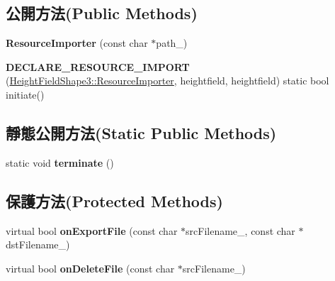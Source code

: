 \subsection*{公開方法(Public Methods)}
\begin{DoxyCompactItemize}
\item 
{\bfseries Resource\+Importer} (const char $\ast$path\+\_\+)\hypertarget{class_magnum_1_1_height_field_shape3_1_1_resource_importer_ad81a6123eea685a7084aedad8a18cd4a}{}\label{class_magnum_1_1_height_field_shape3_1_1_resource_importer_ad81a6123eea685a7084aedad8a18cd4a}

\item 
{\bfseries D\+E\+C\+L\+A\+R\+E\+\_\+\+R\+E\+S\+O\+U\+R\+C\+E\+\_\+\+I\+M\+P\+O\+RT} (\hyperlink{class_magnum_1_1_height_field_shape3_1_1_resource_importer}{Height\+Field\+Shape3\+::\+Resource\+Importer}, heightfield, heightfield) static bool initiate()\hypertarget{class_magnum_1_1_height_field_shape3_1_1_resource_importer_af21999155994114a83900954bc8fc94f}{}\label{class_magnum_1_1_height_field_shape3_1_1_resource_importer_af21999155994114a83900954bc8fc94f}

\end{DoxyCompactItemize}
\subsection*{靜態公開方法(Static Public Methods)}
\begin{DoxyCompactItemize}
\item 
static void {\bfseries terminate} ()\hypertarget{class_magnum_1_1_height_field_shape3_1_1_resource_importer_aa0165c08da06896934d403d7eb194770}{}\label{class_magnum_1_1_height_field_shape3_1_1_resource_importer_aa0165c08da06896934d403d7eb194770}

\end{DoxyCompactItemize}
\subsection*{保護方法(Protected Methods)}
\begin{DoxyCompactItemize}
\item 
virtual bool {\bfseries on\+Export\+File} (const char $\ast$src\+Filename\+\_\+, const char $\ast$dst\+Filename\+\_\+)\hypertarget{class_magnum_1_1_height_field_shape3_1_1_resource_importer_a09b5099ec4671581b44513a415920fee}{}\label{class_magnum_1_1_height_field_shape3_1_1_resource_importer_a09b5099ec4671581b44513a415920fee}

\item 
virtual bool {\bfseries on\+Delete\+File} (const char $\ast$src\+Filename\+\_\+)\hypertarget{class_magnum_1_1_height_field_shape3_1_1_resource_importer_a019dbd28f868accc16a36bbf602d5c61}{}\label{class_magnum_1_1_height_field_shape3_1_1_resource_importer_a019dbd28f868accc16a36bbf602d5c61}

\end{DoxyCompactItemize}
